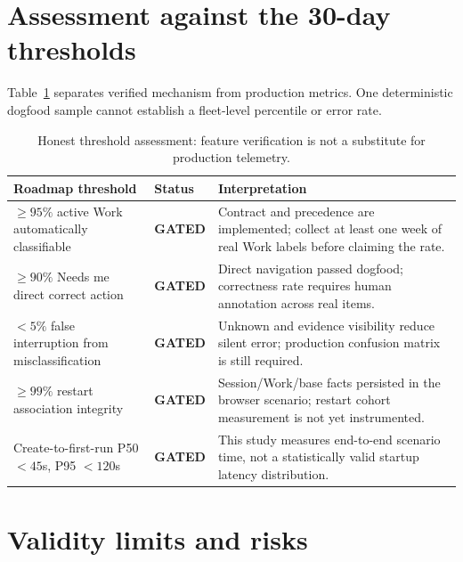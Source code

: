 \documentclass[10pt,a4paper]{article}
\newcommand{\gate}{\textcolor{cradleamber}{\textbf{GATED}}}
\begin{document}
\section{Assessment against the 30-day thresholds}

Table~\ref{tab:metrics} separates verified mechanism from production metrics.
One deterministic dogfood sample cannot establish a fleet-level percentile or
error rate.

\begin{table}[ht]
\centering
\small
\begin{tabularx}{\textwidth}{@{}X l X@{}}
\toprule
Roadmap threshold & Status & Interpretation \\
\midrule
$\geq95\%$ active Work automatically classifiable & \gate & Contract and precedence are implemented; collect at least one week of real Work labels before claiming the rate. \\
$\geq90\%$ Needs me direct correct action & \gate & Direct navigation passed dogfood; correctness rate requires human annotation across real items. \\
$<5\%$ false interruption from misclassification & \gate & Unknown and evidence visibility reduce silent error; production confusion matrix is still required. \\
$\geq99\%$ restart association integrity & \gate & Session/Work/base facts persisted in the browser scenario; restart cohort measurement is not yet instrumented. \\
Create-to-first-run P50 $<45$s, P95 $<120$s & \gate & This study measures end-to-end scenario time, not a statistically valid startup latency distribution. \\
\bottomrule
\end{tabularx}
\caption{Honest threshold assessment: feature verification is not a substitute
for production telemetry.}
\label{tab:metrics}
\end{table}

\section{Validity limits and risks}
\end{document}
